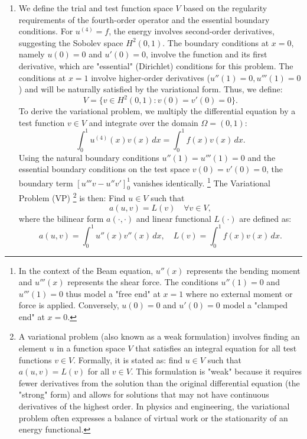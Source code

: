 \begin{solution}
\begin{enumerate}
    \item[(a)] We define the trial and test function space $V$ based on the regularity requirements of the fourth-order operator and the essential boundary conditions. For $u^{(4)} = f$, the energy involves second-order derivatives, suggesting the Sobolev space $H^2(0, 1)$. The boundary conditions at $x=0$, namely $u(0) = 0$ and $u'(0) = 0$, involve the function and its first derivative, which are "essential" (Dirichlet) conditions for this problem. The conditions at $x=1$ involve higher-order derivatives ($u''(1)=0, u'''(1)=0$) and will be naturally satisfied by the variational form. Thus, we define:
    \[
    V = \{ v \in H^2(0, 1) : v(0) = v'(0) = 0 \}.
    \]
    To derive the variational problem, we multiply the differential equation by a test function $v \in V$ and integrate over the domain $\Omega = (0, 1)$:
    \[
    \int_0^1 u^{(4)}(x) v(x) \, dx = \int_0^1 f(x) v(x) \, dx.
    \]
    Using the natural boundary conditions $u''(1) = u'''(1) = 0$ and the essential boundary conditions on the test space $v(0) = v'(0) = 0$, the boundary term $[u'''v - u''v']_0^1$ vanishes identically. \footnote{In the context of the Beam equation, $u''(x)$ represents the bending moment and $u'''(x)$ represents the shear force. The conditions $u''(1)=0$ and $u'''(1)=0$ thus model a "free end" at $x=1$ where no external moment or force is applied. Conversely, $u(0)=0$ and $u'(0)=0$ model a "clamped end" at $x=0$.} The Variational Problem (VP) \footnote{A variational problem (also known as a weak formulation) involves finding an element $u$ in a function space $V$ that satisfies an integral equation for all test functions $v \in V$. Formally, it is stated as: find $u \in V$ such that $a(u, v) = L(v)$ for all $v \in V$. This formulation is "weak" because it requires fewer derivatives from the solution than the original differential equation (the "strong" form) and allows for solutions that may not have continuous derivatives of the highest order. In physics and engineering, the variational problem often expresses a balance of virtual work or the stationarity of an energy functional.} is then: Find $u \in V$ such that
    \[
    a(u, v) = L(v) \quad \forall v \in V,
    \]
    where the bilinear form $a(\cdot, \cdot)$ and linear functional $L(\cdot)$ are defined as:
    \[
    a(u, v) = \int_0^1 u''(x) v''(x) \, dx, \quad L(v) = \int_0^1 f(x) v(x) \, dx.
    \]


\end{enumerate}
\end{solution}
